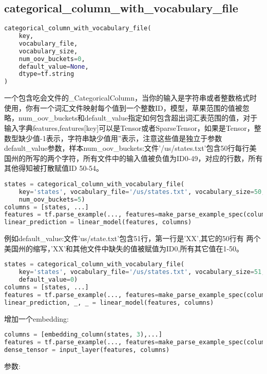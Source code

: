 \subsection{categorical\_column\_with\_vocabulary\_file}
\begin{lstlisting}[language=Python]
categorical_column_with_vocabulary_file(
    key,
    vocabulary_file,
    vocabulary_size,
    num_oov_buckets=0,
    default_value=None,
    dtype=tf.string
)
\end{lstlisting}
一个包含吃会文件的\_CategoricalColumn，当你的输入是字符串或者整数格式时使用，你有一个词汇文件映射每个值到一个整数ID，模型，草果范围的值被忽略，num\_oov\_buckets和default\_value指定如何包含超出词汇表范围的值，对于输入字典features,features[key]可以是Tensor或者SparseTensor，如果是Tensor，整数型缺少值-1表示，字符串缺少值用''表示，注意这些值是独立于参数default\_value参数，样本num\_oov\_buckets:文件'/us/states.txt'包含50行每行美国州的所写的两个字符，所有文件中的输入值被负值为ID0-49，对应的行数，所有其他得知被打散赋值ID 50-54。
\begin{lstlisting}[language=Python]
states = categorical_column_with_vocabulary_file(
    key='states', vocabulary_file='/us/states.txt', vocabulary_size=50,
    num_oov_buckets=5)
columns = [states, ...]
features = tf.parse_example(..., features=make_parse_example_spec(columns))
linear_prediction = linear_model(features, columns)
\end{lstlisting}
例如default\_value:文件'us/state.txt'包含51行，第一行是'XX',其它的50行有
两个美国州的缩写，'XX'和其他文件中缺失的值被赋值为ID0,所有其它值在1-50。
\begin{lstlisting}[language=Python]
states = categorical_column_with_vocabulary_file(
    key='states', vocabulary_file='/us/states.txt', vocabulary_size=51,
    default_value=0)
columns = [states, ...]
features = tf.parse_example(..., features=make_parse_example_spec(columns))
linear_prediction, _, _ = linear_model(features, columns)
\end{lstlisting}
增加一个embedding:
\begin{lstlisting}[language=Python]
columns = [embedding_column(states, 3),...]
features = tf.parse_example(..., features=make_parse_example_spec(columns))
dense_tensor = input_layer(features, columns)
\end{lstlisting}
参数:
